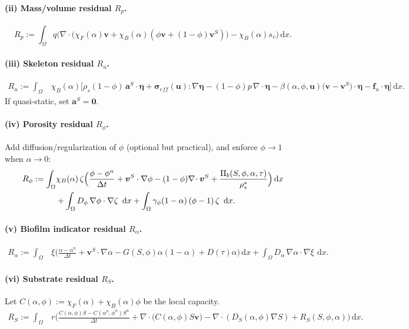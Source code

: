 \documentclass[11pt]{article}
\newcommand{\dd}{\,\mathrm{d}}
\newcommand{\grad}{\nabla}
\newcommand{\divv}{\nabla\!\cdot}
\begin{document}
\paragraph{(ii) Mass/volume residual $R_p$.}
\begin{equation}
R_p :=
\int_\Omega
q\Big(
\divv\big(\chi_F(\alpha)\bm{v}+\chi_B(\alpha)(\phi\bm{v}+(1-\phi)\bm{v}^S)\big)
-\chi_B(\alpha)s_v
\Big)\dd x.
\label{eq:Rp}
\end{equation}

\paragraph{(iii) Skeleton residual $R_u$.}
\begin{align}
R_u :=
\int_\Omega &
\chi_B(\alpha)\Big[
\rho_s(1-\phi)\,\bm{a}^S\cdot\bm{\eta}
+ \bm{\sigma}_{eff}(\bm{u}):\grad\bm{\eta}
-(1-\phi)p\,\divv\bm{\eta}
-\beta(\alpha,\phi,\bm{u})\big(\bm{v}-\bm{v}^S\big)\cdot\bm{\eta}
-\bm{f}_u\cdot\bm{\eta}
\Big]\dd x.
\label{eq:Ru}
\end{align}
If quasi-static, set $\bm{a}^S=\bm{0}$.

\paragraph{(iv) Porosity residual $R_\phi$.}
Add diffusion/regularization of $\phi$ (optional but practical), and enforce $\phi\to 1$ when $\alpha\to 0$:
\begin{align}
R_\phi := \int_\Omega &
\chi_B(\alpha)\,\zeta\Big(
\frac{\phi-\phi^n}{\Delta t} + \bm{v}^S\cdot\grad\phi - (1-\phi)\divv\bm{v}^S
+ \frac{\Pi_b(S,\phi,\alpha,\tau)}{\rho_s^\ast}
\Big)\dd x \notag\\
&+ \int_\Omega D_\phi\,\grad\phi\cdot\grad\zeta\ \dd x
+ \int_\Omega \gamma_\phi(1-\alpha)\,(\phi-1)\,\zeta\ \dd x.
\label{eq:Rphi}
\end{align}

\paragraph{(v) Biofilm indicator residual $R_\alpha$.}
\begin{align}
R_\alpha := \int_\Omega &
\xi\Big(
\frac{\alpha-\alpha^n}{\Delta t} + \bm{v}^S\cdot\grad\alpha
- G(S,\phi)\alpha(1-\alpha) + D(\tau)\alpha
\Big)\dd x
+ \int_\Omega D_\alpha\,\grad\alpha\cdot\grad\xi\ \dd x.
\label{eq:Ralpha}
\end{align}

\paragraph{(vi) Substrate residual $R_S$.}
Let $C(\alpha,\phi):=\chi_F(\alpha)+\chi_B(\alpha)\phi$ be the local capacity.
\begin{align}
R_S := \int_\Omega &
r\Big(
\frac{C(\alpha,\phi)S - C(\alpha^n,\phi^n)S^n}{\Delta t}
+ \divv\big(C(\alpha,\phi)S\bm{v}\big)
- \divv(D_S(\alpha,\phi)\grad S)
+ R_S(S,\phi,\alpha)
\Big)\dd x.
\label{eq:RS}
\end{align}
\end{document}
